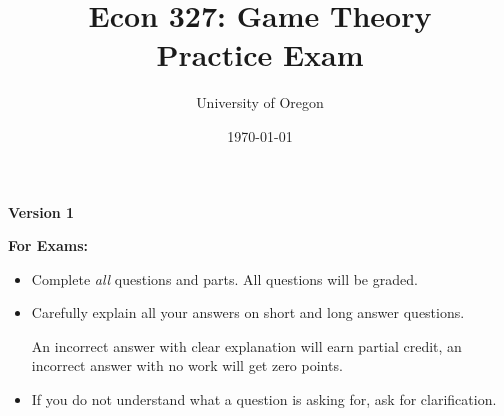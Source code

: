 \documentclass[addpoints]{exam}
\title{
    \textbf{Econ 327: Game Theory} \\ 
    Practice Exam
    }
\author{University of Oregon}
\date{\today}
\begin{document}
\maketitle

\begin{center}
  \Large{\textbf{Version 1}}
\end{center}

\begin{center}
  \gradetable[h][questions]
\end{center}


% 
% 
% 
% 
%  

\begin{center}
  \textbf{For Exams:}
\end{center}

\begin{itemize}
  
  \item Complete \textit{all} questions and parts. 
  All questions will be graded.

  \item Carefully explain all your answers on short and long answer questions.

  An incorrect answer with clear explanation will earn partial credit,
  an incorrect answer with no work will get zero points.

  \item 
  If you do not understand what a question is asking for, 
  ask for clarification. 

\end{itemize}
\end{document}
